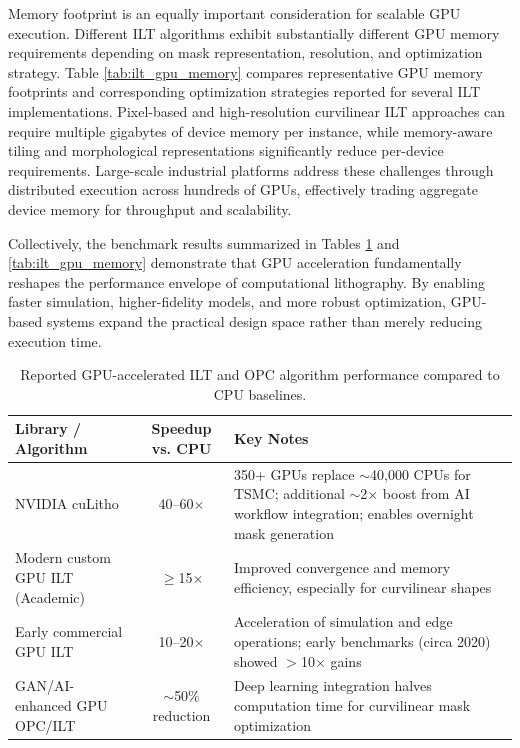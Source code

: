 \documentclass[pdflatex,sn-mathphys-num]{sn-jnl}%
\theoremstyle{thmstyleone}%
\theoremstyle{thmstyletwo}%
\theoremstyle{thmstylethree}%
\begin{document}
Memory footprint is an equally important consideration for scalable GPU execution. Different ILT algorithms exhibit substantially different GPU memory requirements depending on mask representation, resolution, and optimization strategy. Table \ref{tab:ilt_gpu_memory} compares representative GPU memory footprints and corresponding optimization strategies reported for several ILT implementations. Pixel-based and high-resolution curvilinear ILT approaches can require multiple gigabytes of device memory per instance, while memory-aware tiling and morphological representations significantly reduce per-device requirements. Large-scale industrial platforms address these challenges through distributed execution across hundreds of GPUs, effectively trading aggregate device memory for throughput and scalability.

Collectively, the benchmark results summarized in Tables \ref{tab:gpu_speedups} and \ref{tab:ilt_gpu_memory} demonstrate that GPU acceleration fundamentally reshapes the performance envelope of computational lithography. By enabling faster simulation, higher-fidelity models, and more robust optimization, GPU-based systems expand the practical design space rather than merely reducing execution time.

  
\begin{table}[t]
\centering
\small
\setlength{\tabcolsep}{6pt}
\begin{tabularx}{\linewidth}{|l|c|X|}
\hline
\textbf{Library / Algorithm} & \textbf{Speedup vs. CPU} & \textbf{Key Notes} \\
\hline
NVIDIA cuLitho & 40--60$\times$ &
350+ GPUs replace $\sim$40{,}000 CPUs for TSMC; additional $\sim$2$\times$ boost from AI workflow integration; enables overnight mask generation \\ 
\hline
Modern custom GPU ILT (Academic) & $\ge$15$\times$ &
Improved convergence and memory efficiency, especially for curvilinear shapes \\ 
\hline
Early commercial GPU ILT & 10--20$\times$ &
Acceleration of simulation and edge operations; early benchmarks (circa 2020) showed $>$10$\times$ gains \\ 
\hline
GAN/AI-enhanced GPU OPC/ILT & $\sim$50\% reduction &
Deep learning integration halves computation time for curvilinear mask optimization \\ 
\hline
\end{tabularx}
\caption{Reported GPU-accelerated ILT and OPC algorithm performance compared to CPU baselines.}
\label{tab:gpu_speedups}
\end{table}
\end{document}
